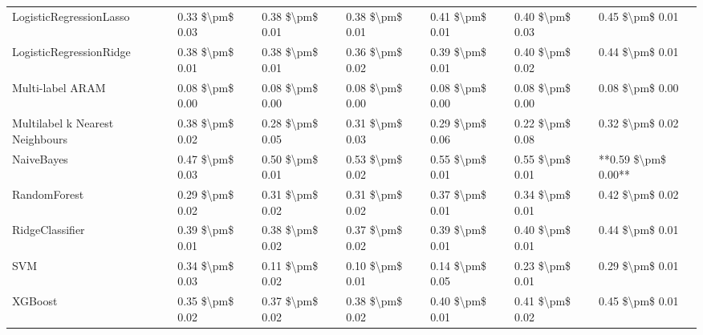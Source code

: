 \begin{tabular}{lllllll}
LogisticRegressionLasso         &  0.33 \$\textbackslash pm\$ 0.03 &           0.38 \$\textbackslash pm\$ 0.01 &       0.38 \$\textbackslash pm\$ 0.01 &        0.41 \$\textbackslash pm\$ 0.01 &                         0.40 \$\textbackslash pm\$ 0.03 &      0.45 \$\textbackslash pm\$ 0.01 \\
LogisticRegressionRidge         &  0.38 \$\textbackslash pm\$ 0.01 &           0.38 \$\textbackslash pm\$ 0.01 &       0.36 \$\textbackslash pm\$ 0.02 &        0.39 \$\textbackslash pm\$ 0.01 &                         0.40 \$\textbackslash pm\$ 0.02 &      0.44 \$\textbackslash pm\$ 0.01 \\
Multi-label ARAM                &  0.08 \$\textbackslash pm\$ 0.00 &           0.08 \$\textbackslash pm\$ 0.00 &       0.08 \$\textbackslash pm\$ 0.00 &        0.08 \$\textbackslash pm\$ 0.00 &                         0.08 \$\textbackslash pm\$ 0.00 &      0.08 \$\textbackslash pm\$ 0.00 \\
Multilabel k Nearest Neighbours &  0.38 \$\textbackslash pm\$ 0.02 &           0.28 \$\textbackslash pm\$ 0.05 &       0.31 \$\textbackslash pm\$ 0.03 &        0.29 \$\textbackslash pm\$ 0.06 &                         0.22 \$\textbackslash pm\$ 0.08 &      0.32 \$\textbackslash pm\$ 0.02 \\
NaiveBayes                      &  0.47 \$\textbackslash pm\$ 0.03 &           0.50 \$\textbackslash pm\$ 0.01 &       0.53 \$\textbackslash pm\$ 0.02 &        0.55 \$\textbackslash pm\$ 0.01 &                         0.55 \$\textbackslash pm\$ 0.01 &  **0.59 \$\textbackslash pm\$ 0.00** \\
RandomForest                    &  0.29 \$\textbackslash pm\$ 0.02 &           0.31 \$\textbackslash pm\$ 0.02 &       0.31 \$\textbackslash pm\$ 0.02 &        0.37 \$\textbackslash pm\$ 0.01 &                         0.34 \$\textbackslash pm\$ 0.01 &      0.42 \$\textbackslash pm\$ 0.02 \\
RidgeClassifier                 &  0.39 \$\textbackslash pm\$ 0.01 &           0.38 \$\textbackslash pm\$ 0.02 &       0.37 \$\textbackslash pm\$ 0.02 &        0.39 \$\textbackslash pm\$ 0.01 &                         0.40 \$\textbackslash pm\$ 0.01 &      0.44 \$\textbackslash pm\$ 0.01 \\
SVM                             &  0.34 \$\textbackslash pm\$ 0.03 &           0.11 \$\textbackslash pm\$ 0.02 &       0.10 \$\textbackslash pm\$ 0.01 &        0.14 \$\textbackslash pm\$ 0.05 &                         0.23 \$\textbackslash pm\$ 0.01 &      0.29 \$\textbackslash pm\$ 0.01 \\
XGBoost                         &  0.35 \$\textbackslash pm\$ 0.02 &           0.37 \$\textbackslash pm\$ 0.02 &       0.38 \$\textbackslash pm\$ 0.02 &        0.40 \$\textbackslash pm\$ 0.01 &                         0.41 \$\textbackslash pm\$ 0.02 &      0.45 \$\textbackslash pm\$ 0.01 \\
\bottomrule
\end{tabular}
